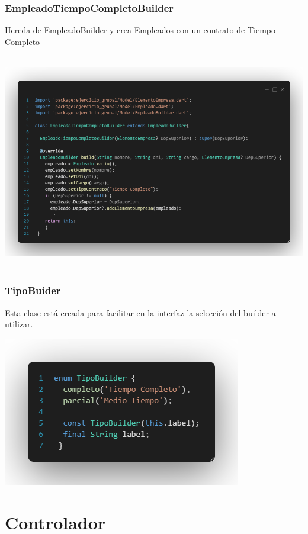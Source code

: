 \documentclass[
]{article}
\begin{document}
\subsubsection{EmpleadoTiempoCompletoBuilder}\label{empleadotiempocompletobuilder}

Hereda de EmpleadoBuilder y crea Empleados con un contrato de Tiempo
Completo

\includegraphics[width=5.90522in,height=3.72222in]{imagenes/TiempoCompleto.png}

\subsubsection{TipoBuider}\label{tipobuider}

Esta clase está creada para facilitar en la interfaz la selección del
builder a utilizar.

\includegraphics[width=4.10417in,height=2.57292in]{imagenes/TipoBuilder.png}

\section{Controlador}\label{controlador}
\end{document}

